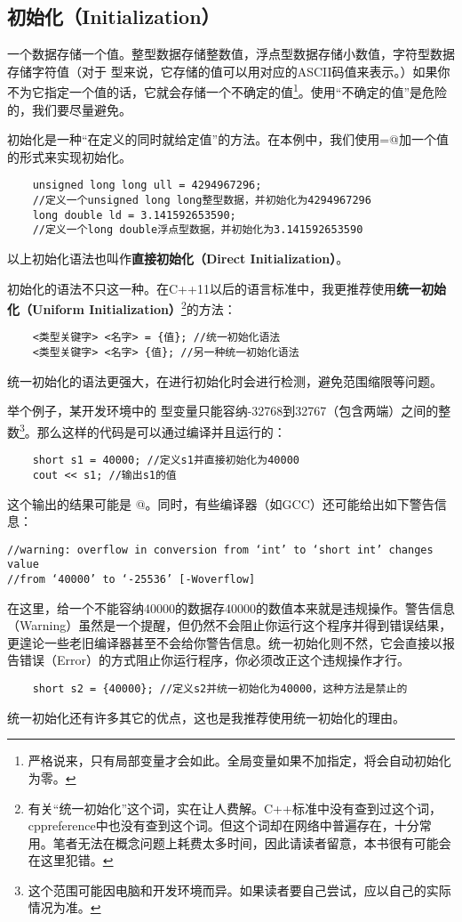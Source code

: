 \subsection*{初始化（Initialization）}
一个数据存储一个值。整型数据存储整数值，浮点型数据存储小数值，字符型数据存储字符值（对于 \lstinline@char@ 型来说，它存储的值可以用对应的ASCII码值来表示。）如果你不为它指定一个值的话，它就会存储一个不确定的值\footnote{严格说来，只有局部变量才会如此。全局变量如果不加指定，将会自动初始化为零。}。使用``不确定的值''是危险的，我们要尽量避免。\par
初始化是一种``在定义的同时就给定值''的方法。在本例中，我们使用\lstinline@=@加一个值的形式来实现初始化。
\begin{lstlisting}
    unsigned long long ull = 4294967296;
    //定义一个unsigned long long整型数据，并初始化为4294967296
    long double ld = 3.141592653590;
    //定义一个long double浮点型数据，并初始化为3.141592653590
\end{lstlisting}
以上初始化语法也叫作\textbf{直接初始化（Direct Initialization）}。\par
初始化的语法不只这一种。在C++11以后的语言标准中，我更推荐使用\textbf{统一初始化（Uniform Initialization）}\footnote{有关``统一初始化''这个词，实在让人费解。C++标准中没有查到过这个词，cppreference中也没有查到这个词。但这个词却在网络中普遍存在，十分常用。笔者无法在概念问题上耗费太多时间，因此请读者留意，本书很有可能会在这里犯错。}的方法：
\begin{lstlisting}
    <类型关键字> <名字> = {值}; //统一初始化语法
    <类型关键字> <名字> {值}; //另一种统一初始化语法
\end{lstlisting}
统一初始化的语法更强大，在进行初始化时会进行检测，避免范围缩限等问题。\par
举个例子，某开发环境中的 \lstinline@short@ 型变量只能容纳-32768到32767（包含两端）之间的整数\footnote{这个范围可能因电脑和开发环境而异。如果读者要自己尝试，应以自己的实际情况为准。}。那么这样的代码是可以通过编译并且运行的：
\begin{lstlisting}
    short s1 = 40000; //定义s1并直接初始化为40000
    cout << s1; //输出s1的值
\end{lstlisting}
这个输出的结果可能是 @。同时，有些编译器（如GCC）还可能给出如下警告信息：
\begin{lstlisting}
//warning: overflow in conversion from ‘int’ to ‘short int’ changes value
//from ‘40000’ to ‘-25536’ [-Woverflow]
\end{lstlisting}\par
在这里，给一个不能容纳40000的数据存40000的数值本来就是违规操作。警告信息（Warning）虽然是一个提醒，但仍然不会阻止你运行这个程序并得到错误结果，更遑论一些老旧编译器甚至不会给你警告信息。统一初始化则不然，它会直接以报告错误（Error）的方式阻止你运行程序，你必须改正这个违规操作才行。
\begin{lstlisting}
    short s2 = {40000}; //定义s2并统一初始化为40000，这种方法是禁止的
\end{lstlisting}\par
统一初始化还有许多其它的优点，这也是我推荐使用统一初始化的理由。\par
